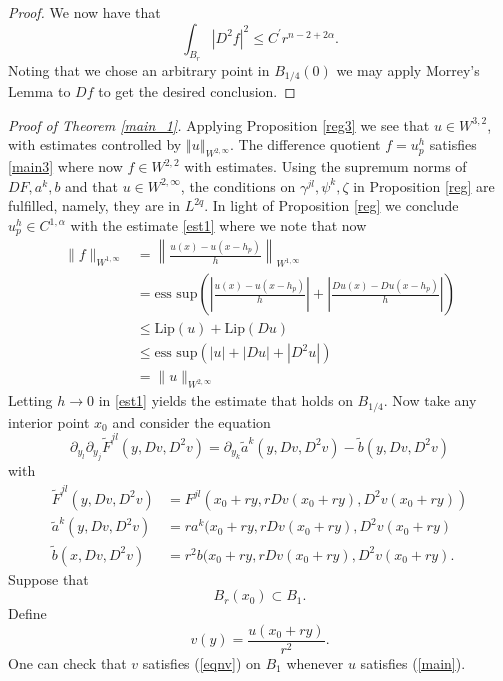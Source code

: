 \documentclass[12pt,leqno]{amsart}%
\theoremstyle{plain}
\numberwithin{equation}{section}
\theoremstyle{definition}
\begin{document}
\begin{proof}
We now have that
\[
\int_{B_{r}}\left\vert D^{2}f\right\vert ^{2}\leq C^{\prime}r^{n-2+2\alpha}.
\]
Noting that we chose an arbitrary point in $B_{1/4}(0)$ we may apply Morrey's
Lemma \cite[Lemma 3, page 8]{SimonETH} to $Df$ to get the desired conclusion.
\end{proof}

\noindent\textit{{Proof of Theorem \ref{main_1}.}} Applying Proposition
\ref{reg3} we see that $u\in W^{3,2}$, with estimates controlled by
$\left\Vert u\right\Vert _{W^{2,\infty}}.$ The difference quotient
$f=u^{h}_{p}$ satisfies \eqref{main3} where now $f\in W^{2,2}$ with estimates.
Using the supremum norms of $DF, a^{k}, b$ and that $u\in W^{2,\infty}$, the
conditions on $\gamma^{jl},\psi^{k},\zeta$ in Proposition \ref{reg} are
fulfilled, namely, they are in $L^{2q}$. In light of Proposition \ref{reg} we
conclude $u_{p}^{h}\in C^{1,\alpha}$ with the estimate \eqref{est1} where we
note that now
\begin{align*}
\|f\|_{W^{1,\infty}}  &  =\left\|  \frac{u(x)-u(x-h_{p})}{h}\right\|
_{W^{1,\infty}}\\
&  =\mbox{ess sup} \left(  \left|  \frac{u(x)-u(x-h_{p})}{h}\right|  +\left|
\frac{Du(x)-Du(x-h_{p})}{h}\right|  \right) \\
&  \leq\mbox{Lip} (u) + \mbox{Lip}(Du)\\
&  \leq\mbox{ess sup}\left(  |u|+|Du|+|D^{2}u| \right) \\
&  = \|u\|_{W^{2,\infty}}%
\end{align*}
Letting $h\rightarrow0$ in \eqref{est1} yields the estimate that holds on $B_{1/4}.$   Now take any interior point $x_0$ and
consider the equation%
\begin{equation}
\partial_{y_{l}}\partial_{y_{j}}\tilde{F}^{jl}(y,Dv,D^{2}v)=\partial_{y_{k}%
}\tilde{a}^{k}(y,Dv,D^{2}v)-\tilde{b}(y,Dv,D^{2}v)\label{eqnv}%
\end{equation}
with
\begin{align*}
\tilde{F}^{jl}(y,Dv,D^{2}v)  & =F^{jl}(x_{0}+ry,rDv(x_{0}+ry),D^{2}%
v(x_{0}+ry))\\
\tilde{a}^{k}(y,Dv,D^{2}v)  & =ra^{k}(x_{0}+ry,rDv(x_{0}+ry),D^{2}%
v(x_{0}+ry)\\
\tilde{b}(x,Dv,D^{2}v)  & =r^{2}b(x_{0}+ry,rDv(x_{0}+ry),D^{2}v(x_{0}+ry).
\end{align*}
Suppose that
\[
B_{r}(x_{0})\subset B_{1}.
\]
Define
\[
v(y)=\frac{u(x_{0}+ry)}{r^{2}}.
\]
One can check that $v$ satisfies (\ref{eqnv}) on $B_{1}$ whenever $u$
satisfies (\ref{main}).
\end{document}
